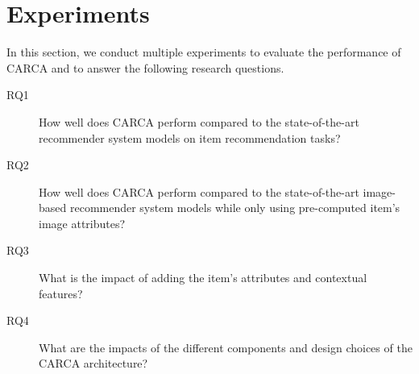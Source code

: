 \documentclass[sigconf,natbib=true]{acmart}
\begin{document}
\section{Experiments} 
In this section, we conduct multiple experiments to evaluate the performance of CARCA and to answer the following research questions.
\begin{description}
 \item[RQ1] How well does CARCA perform compared to the state-of-the-art recommender system models on item recommendation tasks?
 
  \item[RQ2] How well does CARCA perform compared to the state-of-the-art image-based recommender system models while only using pre-computed item's image attributes?
 
  \item[RQ3] What is the impact of adding the item's attributes and contextual features?
  
  \item[RQ4] What are the impacts of the different components and design choices of the CARCA architecture?
 
\end{description}
\end{document}
